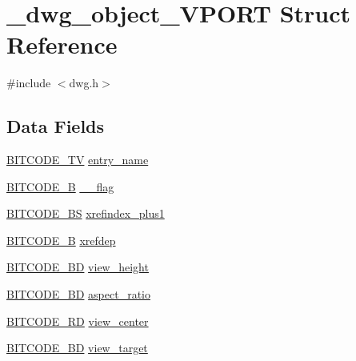 \hypertarget{struct__dwg__object__VPORT}{\section{\-\_\-dwg\-\_\-object\-\_\-\-V\-P\-O\-R\-T \-Struct \-Reference}
\label{struct__dwg__object__VPORT}
}


{\ttfamily \#include $<$dwg.\-h$>$}

\subsection*{\-Data \-Fields}
\begin{DoxyCompactItemize}
\item 
\hyperlink{dwg_8h_a2a7e040c6e36ca039b03608679ecaf7c}{\-B\-I\-T\-C\-O\-D\-E\-\_\-\-T\-V} \hyperlink{struct__dwg__object__VPORT_a8b0da76add5c7c6623c6e55712460d5a}{entry\-\_\-name}
\item 
\hyperlink{dwg_8h_ab533b1f62d9086749e3bb5b67e9f224e}{\-B\-I\-T\-C\-O\-D\-E\-\_\-\-B} \hyperlink{struct__dwg__object__VPORT_a3fb30541c21e4d586586458ff034d3ca}{\-\_\-\_\-flag}
\item 
\hyperlink{dwg_8h_a94297606fbd4a4ff97e8add284af0809}{\-B\-I\-T\-C\-O\-D\-E\-\_\-\-B\-S} \hyperlink{struct__dwg__object__VPORT_ac95f2ff052649a2523bccc1f45261050}{xrefindex\-\_\-plus1}
\item 
\hyperlink{dwg_8h_ab533b1f62d9086749e3bb5b67e9f224e}{\-B\-I\-T\-C\-O\-D\-E\-\_\-\-B} \hyperlink{struct__dwg__object__VPORT_aa2b6c8f26cafc3921994740b02b2f112}{xrefdep}
\item 
\hyperlink{dwg_8h_a3c1e6781466b74ba07785d57da70ed97}{\-B\-I\-T\-C\-O\-D\-E\-\_\-\-B\-D} \hyperlink{struct__dwg__object__VPORT_acd5af11b077adaf9b3af92972e7a42d2}{view\-\_\-height}
\item 
\hyperlink{dwg_8h_a3c1e6781466b74ba07785d57da70ed97}{\-B\-I\-T\-C\-O\-D\-E\-\_\-\-B\-D} \hyperlink{struct__dwg__object__VPORT_afc1790dc33879b70944c164b6c14d488}{aspect\-\_\-ratio}
\item 
\hyperlink{dwg_8h_a1d23a9bc9a02453876b244dc6706f6a6}{\-B\-I\-T\-C\-O\-D\-E\-\_\-R\-D} \hyperlink{struct__dwg__object__VPORT_a7ec620594778a365aae4dec4734fe2be}{view\-\_\-center}
\item 
\hyperlink{dwg_8h_a00698ef1bb072aa0a9360c6fc1c57587}{\-B\-I\-T\-C\-O\-D\-E\-\_\-B\-D} \hyperlink{struct__dwg__object__VPORT_a43d843b17b5fdd5098eb777c361ce403}{view\-\_\-target}
\item 

\end{DoxyCompactItemize}
